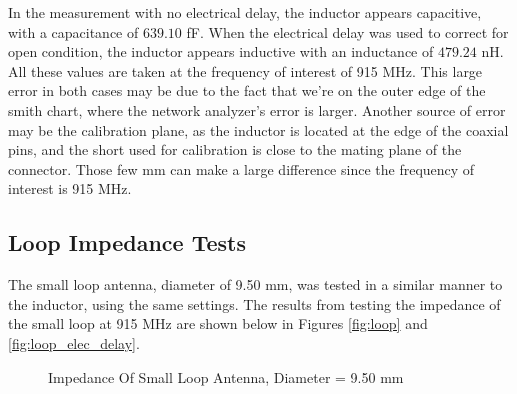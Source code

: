 \documentclass[12pt,onecolumn,titlepage]{article}
\begin{document}
In the measurement with no electrical delay, the inductor appears capacitive, with a capacitance of $639.10$ fF. When the electrical delay was used to correct for open condition, the inductor appears inductive with an inductance of $479.24$ nH. All these values are taken at the frequency of interest of 915 MHz. This large error in both cases may be due to the fact that we're on the outer edge of the smith chart, where the network analyzer's error is larger. Another source of error may be the calibration plane, as the inductor is located at the edge of the coaxial pins, and the short used for calibration is close to the mating plane of the connector. Those few mm can make a large difference since the frequency of interest is 915 MHz. 

\subsection{Loop Impedance Tests}
\indent \indent The small loop antenna, diameter of 9.50 mm, was tested in a similar manner to the inductor, using the same settings. The results from testing the impedance of the small loop at 915 MHz are shown below in Figures \ref{fig:loop} and \ref{fig:loop_elec_delay}.

\begin{figure}[h!]
	\centering
	\label{fig:loop_test1}
	\caption{Impedance Of Small Loop Antenna, Diameter = 9.50 mm}
\end{figure}
\end{document}
